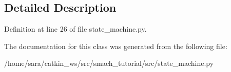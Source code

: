 \subsection{Detailed Description}


Definition at line 26 of file state\+\_\+machine.\+py.



The documentation for this class was generated from the following file\+:\begin{DoxyCompactItemize}
\item 
/home/sara/catkin\+\_\+ws/src/smach\+\_\+tutorial/src/state\+\_\+machine.\+py\end{DoxyCompactItemize}
